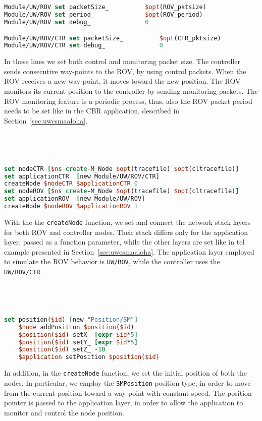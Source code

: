 \documentclass[11pt]{article}
\begin{document}
\ 
{\scriptsize\tt
\begin{lstlisting}[language=tcl]
Module/UW/ROV set packetSize_          $opt(ROV_pktsize)
Module/UW/ROV set period_              $opt(ROV_period)
Module/UW/ROV set debug_               0

Module/UW/ROV/CTR set packetSize_          $opt(CTR_pktsize)
Module/UW/ROV/CTR set debug_               0
\end{lstlisting}
}

In these lines we set both control and monitoring packet size. 
The controller sends consecutive way-points to the ROV, by using control packets. When the ROV receives a new way-point, it moves toward the new position.
The ROV monitors its current position to the controller by sending monitoring packets. The ROV monitoring feature is a periodic process, thus, also the ROV packet period needs to be set like in the CBR application, described in Section~\ref{sec:uwcsmaaloha}.

\ 
{\scriptsize\tt
\begin{lstlisting}[language=tcl]
set nodeCTR [$ns create-M_Node $opt(tracefile) $opt(cltracefile)] 
set applicationCTR  [new Module/UW/ROV/CTR]
createNode $nodeCTR $applicationCTR 0
set nodeROV [$ns create-M_Node $opt(tracefile) $opt(cltracefile)] 
set applicationROV  [new Module/UW/ROV]
createNode $nodeROV $applicationROV 1
\end{lstlisting}
}

With the the {\tt createNode} function, we set and connect the network stack layers for both ROV and controller nodes. Their stack differs only for the application layer, passed as a function parameter, while the other layers are set like in tcl example presented in Section~\ref{sec:uwcsmaaloha}. The application layer employed to simulate the ROV behavior is {\tt UW/ROV}, while the controller uses the {\tt UW/ROV/CTR}.

\ 
{\scriptsize\tt
\begin{lstlisting}[language=tcl]  
    set position($id) [new "Position/SM"]
    $node addPosition $position($id)
    $position($id) setX_ [expr $id*5]
    $position($id) setY_ [expr $id*5]
    $position($id) setZ_ -10
    $application setPosition $position($id)
\end{lstlisting}
}

In addition, in the {\tt createNode} function, we set the initial position of both the nodes. 
In particular, we employ the {\tt SMPosition} position type, in order to move from the current position toward a way-point with constant speed. The position pointer is passed to the application layer, in order to allow the application to monitor and control the node position.
\end{document}

